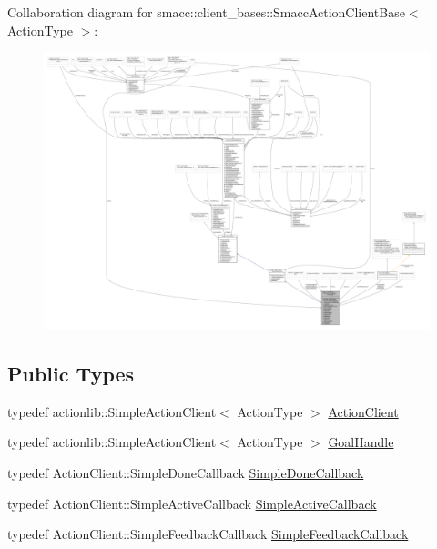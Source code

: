 Collaboration diagram for smacc\+:\+:client\+\_\+bases\+:\+:Smacc\+Action\+Client\+Base$<$ Action\+Type $>$\+:
\nopagebreak
\begin{figure}[H]
\begin{center}
\leavevmode
\includegraphics[width=350pt]{classsmacc_1_1client__bases_1_1SmaccActionClientBase__coll__graph}
\end{center}
\end{figure}
\subsection*{Public Types}
\begin{DoxyCompactItemize}
\item 
typedef actionlib\+::\+Simple\+Action\+Client$<$ Action\+Type $>$ \hyperlink{classsmacc_1_1client__bases_1_1SmaccActionClientBase_ab4cb0717885b95d577f82f4133db7f5f}{Action\+Client}
\item 
typedef actionlib\+::\+Simple\+Action\+Client$<$ Action\+Type $>$ \hyperlink{classsmacc_1_1client__bases_1_1SmaccActionClientBase_a43e1a844615218b95151d456eb32b835}{Goal\+Handle}
\item 
typedef Action\+Client\+::\+Simple\+Done\+Callback \hyperlink{classsmacc_1_1client__bases_1_1SmaccActionClientBase_a56eb842a85c65248fda43909b1aaeac1}{Simple\+Done\+Callback}
\item 
typedef Action\+Client\+::\+Simple\+Active\+Callback \hyperlink{classsmacc_1_1client__bases_1_1SmaccActionClientBase_acfd06f7c33418c03a340e74b00a4dddc}{Simple\+Active\+Callback}
\item 
typedef Action\+Client\+::\+Simple\+Feedback\+Callback \hyperlink{classsmacc_1_1client__bases_1_1SmaccActionClientBase_a207f1655464affc35459f47a35d04069}{Simple\+Feedback\+Callback}
\end{DoxyCompactItemize}
